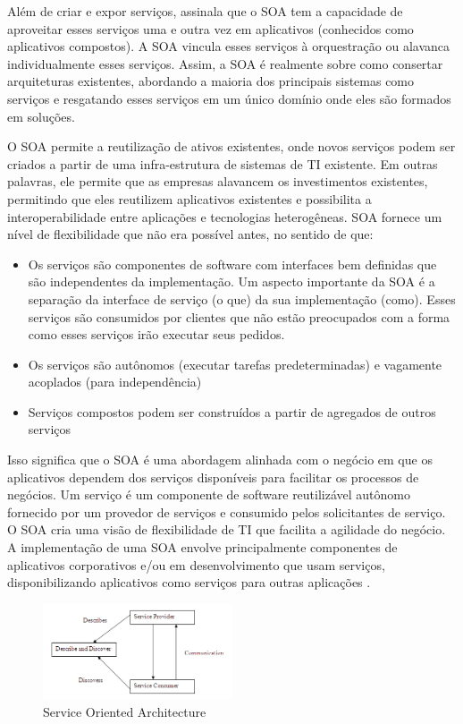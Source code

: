 Além de criar e expor serviços,  assinala que o SOA tem a capacidade de aproveitar esses serviços uma e outra vez em aplicativos (conhecidos como aplicativos compostos). A SOA vincula esses serviços à orquestração ou alavanca individualmente esses serviços. Assim, a SOA é realmente sobre como consertar arquiteturas existentes, abordando a maioria dos principais sistemas como serviços e resgatando esses serviços em um único domínio onde eles são formados em soluções.

 O SOA permite a reutilização de ativos existentes, onde novos serviços podem ser criados a partir de uma infra-estrutura de sistemas de TI existente. Em outras palavras, ele permite que as empresas alavancem os investimentos existentes, permitindo que eles reutilizem aplicativos existentes e possibilita a interoperabilidade entre aplicações e tecnologias heterogêneas. SOA fornece um nível de flexibilidade que não era possível antes, no sentido de que:

\begin{itemize}
    \item Os serviços são componentes de software com interfaces bem definidas que são independentes da implementação. Um aspecto importante da SOA é a separação da interface de serviço (o que) da sua implementação (como). Esses serviços são consumidos por clientes que não estão preocupados com a forma como esses serviços irão executar seus pedidos.
    \item Os serviços são autônomos (executar tarefas predeterminadas) e vagamente acoplados (para independência)
    \item Serviços compostos podem ser construídos a partir de agregados de outros serviços
\end{itemize}

Isso significa que o SOA é uma abordagem alinhada com o negócio em que os aplicativos dependem dos serviços disponíveis para facilitar os processos de negócios. Um serviço é um componente de software reutilizável autônomo fornecido por um provedor de serviços e consumido pelos solicitantes de serviço. O SOA cria uma visão de flexibilidade de TI que facilita a agilidade do negócio. A implementação de uma SOA envolve principalmente componentes de aplicativos corporativos e/ou em desenvolvimento que usam serviços, disponibilizando aplicativos como serviços para outras aplicações \cite{soa-book}.

\begin{figure}[ht]
    \centering
    \includegraphics[width=0.5\textwidth]{figuras/soa.png}
    \caption{Service Oriented Architecture}
    \label{fig:soa}
\end{figure}

